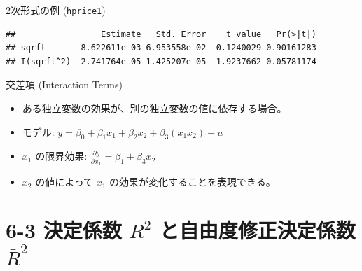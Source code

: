 \documentclass[
  ignorenonframetext,
]{beamer}
\newenvironment{Shaded}{\begin{snugshade}}{\end{snugshade}}
\newcommand{\AttributeTok}[1]{\textcolor[rgb]{0.77,0.63,0.00}{#1}}
\newcommand{\CommentTok}[1]{\textcolor[rgb]{0.56,0.35,0.01}{\textit{#1}}}
\newcommand{\DecValTok}[1]{\textcolor[rgb]{0.00,0.00,0.81}{#1}}
\newcommand{\FunctionTok}[1]{\textcolor[rgb]{0.00,0.00,0.00}{#1}}
\newcommand{\NormalTok}[1]{#1}
\newcommand{\OtherTok}[1]{\textcolor[rgb]{0.56,0.35,0.01}{#1}}
\newcommand{\SpecialCharTok}[1]{\textcolor[rgb]{0.00,0.00,0.00}{#1}}
\providecommand{\tightlist}{%
  \setlength{\itemsep}{0pt}\setlength{\parskip}{0pt}}
\begin{document}
\begin{frame}[fragile]{2次形式の例 (\texttt{hprice1})}
\protect\hypertarget{ux6b21ux5f62ux5f0fux306eux4f8b-hprice1}{}
\footnotesize

\begin{Shaded}
\end{Shaded}

\begin{verbatim}
##                 Estimate   Std. Error    t value   Pr(>|t|)
## sqrft      -8.622611e-03 6.953558e-02 -0.1240029 0.90161283
## I(sqrft^2)  2.741764e-05 1.425207e-05  1.9237662 0.05781174
\end{verbatim}

\normalsize
\end{frame}

\begin{frame}{交差項 (Interaction Terms)}
\protect\hypertarget{ux4ea4ux5deeux9805-interaction-terms}{}
\begin{itemize}
\tightlist
\item
  ある独立変数の効果が、別の独立変数の値に依存する場合。
\item
  モデル:
  \(y = \beta_0 + \beta_1 x_1 + \beta_2 x_2 + \beta_3 (x_1 x_2) + u\)
\item
  \(x_1\) の限界効果:
  \(\frac{\partial y}{\partial x_1} = \beta_1 + \beta_3 x_2\)
\item
  \(x_2\) の値によって \(x_1\) の効果が変化することを表現できる。
\end{itemize}
\end{frame}

\hypertarget{ux6c7aux5b9aux4fc2ux6570-r2-ux3068ux81eaux7531ux5ea6ux4feeux6b63ux6c7aux5b9aux4fc2ux6570-barr2}{%
\section{\texorpdfstring{6-3 決定係数 \(R^2\) と自由度修正決定係数
\(\bar{R}^2\)}{6-3 決定係数 R\^{}2 と自由度修正決定係数 \textbackslash bar\{R\}\^{}2}}\label{ux6c7aux5b9aux4fc2ux6570-r2-ux3068ux81eaux7531ux5ea6ux4feeux6b63ux6c7aux5b9aux4fc2ux6570-barr2}}
\end{document}
